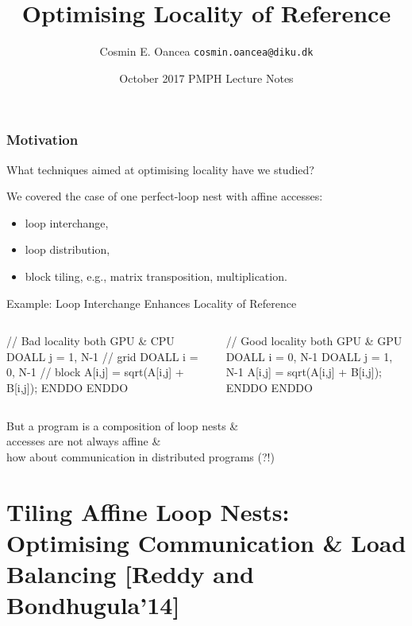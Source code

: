 \documentclass{beamer}
\title[Locality]{Optimising Locality of Reference}
\author[C.~Oancea]{Cosmin E. Oancea {\tt cosmin.oancea@diku.dk}}
\institute{Department of Computer Science (DIKU)\\University of Copenhagen}
\date[Oct 2017]{October 2017 PMPH Lecture Notes}
\newcommand{\emphh}[1]{\textcolor{CosGreen}{ #1}}
\begin{document}
\titleslide




\begin{frame}[fragile,t]
  \frametitle{Motivation}

\alert{What techniques aimed at optimising locality have we studied?}\pause\smallskip

\emphh{We covered the case of one perfect-loop nest with affine accesses}:
\begin{itemize}
    \item loop interchange,
    \item loop distribution,
    \item block tiling, e.g., matrix transposition, multiplication.
\end  {itemize}\bigskip

\begin{block}{Example: Loop Interchange Enhances Locality of Reference}
\begin{columns}
\begin{colorcode}
// Bad locality both GPU \& CPU
\emphh{DOALL j = 1, N-1} // grid
  \emphh{DOALL i = 0, N-1} // block
    A[i,j] = sqrt(A[i,j] + B[i,j]);
  ENDDO
ENDDO
\end{colorcode}
\begin{colorcode}
// Good locality both GPU \& GPU
\emphh{DOALL i = 0, N-1}
  \emphh{DOALL j = 1, N-1}    
    A[i,j] = sqrt(A[i,j] + B[i,j]);
  ENDDO
ENDDO
\end{colorcode}
\end{columns}
\end{block} 
 
\alert{But a program is a composition of loop nests \&\\ 
accesses are not always affine \&\\
how about communication in distributed programs (?!)}

\end{frame}


\begin{frame}[fragile]
	\tableofcontents
\end{frame}

\section{Tiling Affine Loop Nests: Optimising Communication \& Load Balancing [Reddy and Bondhugula'14]}
\end{document}
